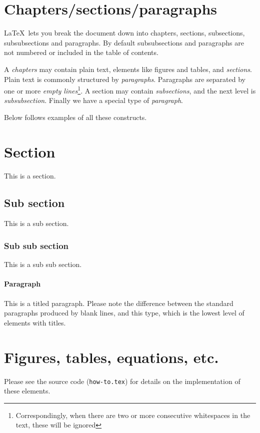 \section{Chapters/sections/paragraphs}

 \LaTeX\  lets you break the document down into chapters, sections, subsections, subsubsections and paragraphs. By default subsubsections and paragraphs are not numbered or included in the table of contents. 

A {\em chapters} may contain plain text, elements like figures and tables, and {\em sections}. 
Plain text is commonly structured by {\em paragraphs}. Paragraphs are separated by one or more {\em empty lines}\footnote{Correspondingly, when there are two or more       consecutive          whitespaces in the text, these will be ignored}. 
A section may contain {\em subsections}, and the next level is {\em subsubsection}.
Finally we have a special type of {\em paragraph}.

Below follows examples of all these constructs.


\section{Section} 
This is a section. \lipsum[10-12]
\subsection{Sub section} 
This is a sub section. \lipsum[13-14]
\subsubsection{Sub sub section} 
This is a sub sub section. \lipsum[15-16]
\paragraph{Paragraph} 
This is a titled paragraph.
Please note the difference between the standard paragraphs produced by blank lines, and this type, which is the lowest level of elements with titles.

\lipsum[17-18]


\section{Figures, tables, equations, etc.}

Please see the source code ({\tt how-to.tex}) for details on the implementation of these elements.


